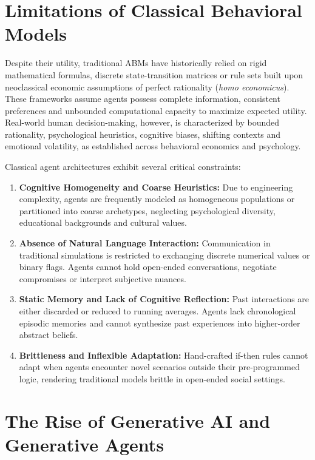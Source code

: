 \documentclass[12pt,a4paper]{report}
\begin{document}
\section{Limitations of Classical Behavioral Models}
\label{sec:limitations}

Despite their utility, traditional ABMs have historically relied on rigid mathematical formulas, discrete state-transition matrices or rule sets built upon neoclassical economic assumptions of perfect rationality (\textit{homo economicus}). These frameworks assume agents possess complete information, consistent preferences and unbounded computational capacity to maximize expected utility. Real-world human decision-making, however, is characterized by bounded rationality, psychological heuristics, cognitive biases, shifting contexts and emotional volatility, as established across behavioral economics and psychology.

Classical agent architectures exhibit several critical constraints:
\begin{enumerate}[label=\arabic*.]
    \item \textbf{Cognitive Homogeneity and Coarse Heuristics:} Due to engineering complexity, agents are frequently modeled as homogeneous populations or partitioned into coarse archetypes, neglecting psychological diversity, educational backgrounds and cultural values.
    \item \textbf{Absence of Natural Language Interaction:} Communication in traditional simulations is restricted to exchanging discrete numerical values or binary flags. Agents cannot hold open-ended conversations, negotiate compromises or interpret subjective nuances.
    \item \textbf{Static Memory and Lack of Cognitive Reflection:} Past interactions are either discarded or reduced to running averages. Agents lack chronological episodic memories and cannot synthesize past experiences into higher-order abstract beliefs.
    \item \textbf{Brittleness and Inflexible Adaptation:} Hand-crafted if-then rules cannot adapt when agents encounter novel scenarios outside their pre-programmed logic, rendering traditional models brittle in open-ended social settings.
\end{enumerate}

\section{The Rise of Generative AI and Generative Agents}
\label{sec:genai_shift}
\end{document}
